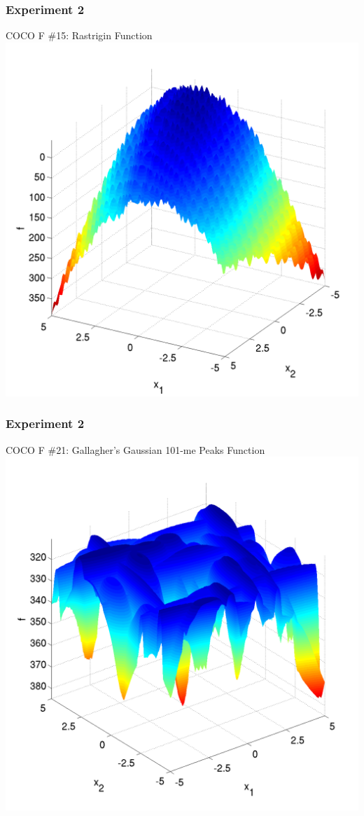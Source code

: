 \documentclass{beamer}
\begin{document}
	\begin{frame}
		\frametitle{Experiment 2}
		\centering
		COCO F \#15: Rastrigin Function
		\includegraphics[height=0.8\textheight]{rastrigin_landscape}
	\end{frame}	
	
	\begin{frame}
		\centering	
		\frametitle{Experiment 2}
		COCO F \#21: Gallagher's Gaussian 101-me Peaks Function
		\includegraphics[height=0.8\textheight]{gallagher_landscape}
	\end{frame}		
	
\end{document}
